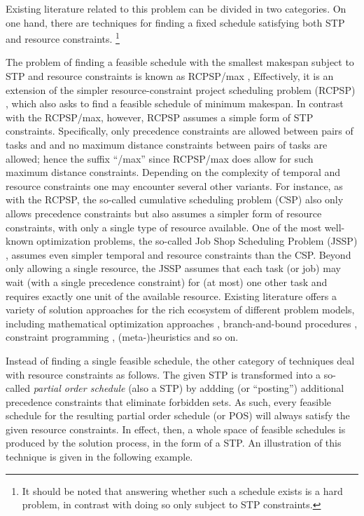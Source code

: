 	Existing literature related to this problem can be divided in two categories.
	On one hand, there are techniques for finding a fixed schedule satisfying both STP and resource constraints.%
	\footnote{It should be noted that answering whether such a schedule exists is a hard problem,
	in contrast with doing so only subject to STP constraints.}

	The problem of finding a feasible schedule with the smallest makespan subject to STP and 
	resource constraints is known as RCPSP/max \cite{schutt2013solving, oddi2009iterative}, 
	Effectively, it is an extension of the simpler resource-constraint project scheduling problem (RCPSP) \cite{hartmann2010survey},
	which also asks to find a feasible schedule of minimum makespan.
	In contrast with the RCPSP/max, however, RCPSP assumes a simple form of STP constraints.
	Specifically, only precedence constraints are allowed between pairs of tasks and and no maximum distance constraints between pairs of tasks are allowed;
	hence the suffix ``/max'' since RCPSP/max does allow for such maximum distance constraints.
	Depending on the complexity of temporal and resource constraints one may encounter several other variants.
	For instance, as with the RCPSP, the so-called cumulative scheduling problem (CSP) \cite{michel2004iterative} also only allows precedence constraints 
	but also assumes a simpler form of resource constraints, with only a single type of resource available.
	One of the most well-known optimization problems, the so-called Job Shop Scheduling Problem (JSSP) \cite{adams1988shifting}, 
	assumes even simpler temporal and resource constraints than the CSP.
	Beyond only allowing a single resource, the JSSP assumes that each task (or job) may wait 
	(with a single precedence constraint) for (at most) one other task and requires exactly one unit of the available resource.
	Existing literature offers a variety of solution approaches for the rich ecosystem of different problem models,
	including mathematical optimization approaches \cite{kone2011event}, branch-and-bound procedures \cite{brucker1998branch}, constraint programming \cite{schutt2013solving}, 
	(meta-)heuristics \cite{kolisch2006experimental} and so on.

	Instead of finding a single feasible schedule, the other category of techniques deal with resource constraints as follows.
	The given STP is transformed into a so-called \emph{partial order schedule} (also a STP) 
	by addding (or ``posting'') additional precedence constraints that eliminate forbidden sets.
	As such, every feasible schedule for the resulting partial order schedule (or POS) will always satisfy the given resource constraints.
	In effect, then, a whole space of feasible schedules is produced by the solution process, in the form of a STP.
	An illustration of this technique is given in the following example.


